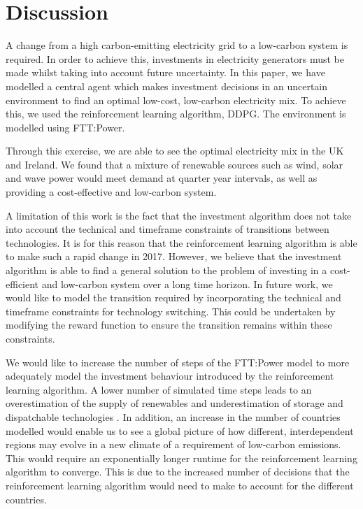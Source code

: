 \documentclass{article}
\begin{document}


\section{Discussion}

A change from a high carbon-emitting electricity grid to a low-carbon system is required. In order to achieve this, investments in electricity generators must be made whilst taking into account future uncertainty. In this paper, we have modelled a central agent which makes investment decisions in an uncertain environment to find an optimal low-cost, low-carbon electricity mix. To achieve this, we used the reinforcement learning algorithm, DDPG. The environment is modelled using FTT:Power.

Through this exercise, we are able to see the optimal electricity mix in the UK and Ireland. We found that a mixture of renewable sources such as wind, solar and wave power would meet demand at quarter year intervals, as well as providing a cost-effective and low-carbon system.

A limitation of this work is the fact that the investment algorithm does not take into account the technical and timeframe constraints of transitions between technologies. It is for this reason that the reinforcement learning algorithm is able to make such a rapid change in 2017. However, we believe that the investment algorithm is able to find a general solution to the problem of investing in a cost-efficient and low-carbon system over a long time horizon. In future work, we would like to model the transition required by incorporating the technical and timeframe constraints for technology switching. This could be undertaken by modifying the reward function to ensure the transition remains within these constraints.


We would like to increase the number of steps of the FTT:Power model to more adequately model the investment behaviour introduced by the reinforcement learning algorithm. A lower number of simulated time steps leads to an overestimation of the supply of renewables and underestimation of storage and dispatchable technologies \cite{Ludig2011}. In addition, an increase in the number of countries modelled would enable us to see a global picture of how different, interdependent regions may evolve in a new climate of a requirement of low-carbon emissions. This would require an exponentially longer runtime for the reinforcement learning algorithm to converge. This is due to the increased number of decisions that the reinforcement learning algorithm would need to make to account for the different countries. 
\end{document}
